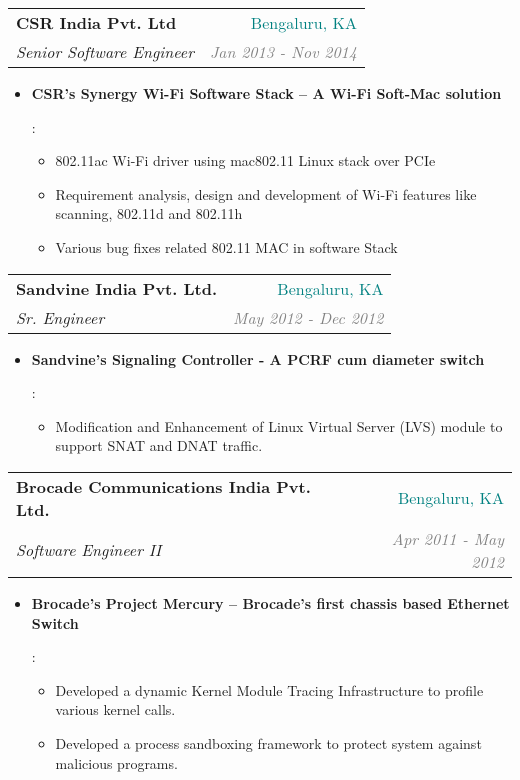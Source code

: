 \documentclass[letterpaper,11pt]{article}
\makeatletter
\newcommand{\resumeItem}[2]{
  \item\small{
    \textbf{#1}{: #2 \vspace{-2pt}}
  }
}
\newcommand{\resumeSubheading}[4]{
  \vspace{-1pt}\item
    \begin{tabular*}{0.97\textwidth}[t]{l@{\extracolsep{\fill}}r}
      \textbf{#1} & #2 \\
      \textit{\small#3} & \textit{\small #4} \\
    \end{tabular*}\vspace{-5pt}
}
\newcommand{\resumeItemListStart}{\begin{itemize}}
\newcommand{\resumeItemListEnd}{\end{itemize}\vspace{-5pt}}
\makeatother
\begin{document}
    \resumeSubheading
      {CSR India Pvt. Ltd}{\textcolor{teal}{Bengaluru, KA}}
      {Senior Software Engineer}{\textcolor{GRAY}{Jan 2013 - Nov 2014}}
      \resumeItemListStart
        \resumeItem{CSR’s Synergy Wi-Fi Software Stack – A Wi-Fi Soft-Mac solution}
          {
	          \begin{itemize}
    		      \item {802.11ac Wi-Fi driver using mac802.11 Linux stack over PCIe}
    	    		  \item {Requirement analysis, design and development of Wi-Fi features like scanning, 802.11d and 802.11h}
          	 \item {Various bug fixes related 802.11 MAC in software Stack}          
          	\end{itemize}  
          }
      \resumeItemListEnd

    \resumeSubheading
      {Sandvine India Pvt. Ltd.}{\textcolor{teal}{Bengaluru, KA}}
      {Sr. Engineer}{\textcolor{GRAY}{May 2012 - Dec 2012}}
      \resumeItemListStart
        \resumeItem{Sandvine’s Signaling Controller - A PCRF cum diameter switch}
          {
          \begin{itemize}
          \item {Modification and Enhancement of Linux Virtual Server (LVS) module to support SNAT and DNAT traffic.}
          \end{itemize}
          }
      \resumeItemListEnd

    \resumeSubheading
      {Brocade Communications India Pvt. Ltd.}{\textcolor{teal}{Bengaluru, KA}}
      {Software Engineer II}{\textcolor{GRAY}{Apr 2011 - May 2012}}
      \resumeItemListStart
        \resumeItem{Brocade’s Project Mercury – Brocade’s first chassis based Ethernet Switch}
      {
         \begin{itemize}
          \item Developed a dynamic Kernel Module Tracing Infrastructure to profile various kernel calls.
          \item Developed a process sandboxing framework to protect system against malicious programs.
		\end{itemize}
	}
		  \resumeItemListEnd
		
\end{document}
